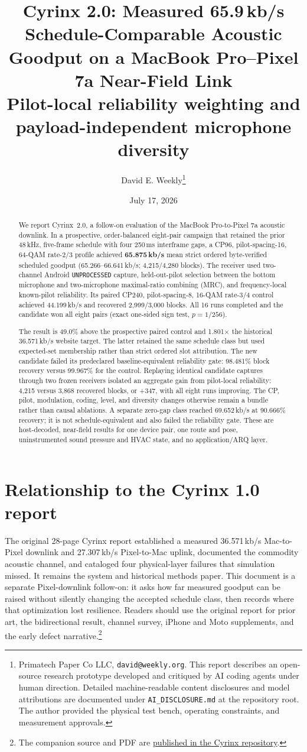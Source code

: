 \documentclass[11pt]{article}
\title{\textbf{Cyrinx 2.0: Measured 65.9\,kb/s Schedule-Comparable
Acoustic Goodput on a MacBook Pro--Pixel 7a Near-Field Link}\\[0.45em]
\large Pilot-local reliability weighting and payload-independent microphone
diversity}
\author{David E. Weekly\thanks{Primatech Paper Co LLC,
\texttt{david@weekly.org}. This report describes an open-source research
prototype developed and critiqued by AI coding agents under human direction. Detailed machine-readable content disclosures and model attributions are documented under \texttt{AI\_DISCLOSURE.md} at the repository root. The author
provided the physical test bench, operating constraints, and measurement
approvals.}}
\date{July 17, 2026}
\newcommand{\cyrtwo}{Cyrinx~2.0}
\begin{document}
\maketitle

\begin{abstract}
We report \cyrtwo, a follow-on evaluation of the MacBook Pro-to-Pixel 7a
acoustic downlink. In a prospective, order-balanced eight-pair campaign that
retained the prior 48\,kHz, five-frame schedule with four 250\,ms interframe
gaps, a
CP96, pilot-spacing-16, 64-QAM rate-2/3 profile achieved
\textbf{65.875\,kb/s} mean strict ordered byte-verified scheduled goodput
(65.266--66.641\,kb/s; 4,215/4,280 blocks). The receiver used two-channel
Android \texttt{UNPROCESSED} capture, held-out-pilot selection between the
bottom microphone and two-microphone maximal-ratio combining (MRC), and
frequency-local known-pilot reliability. Its paired CP240,
pilot-spacing-8, 16-QAM rate-3/4 control achieved 44.199\,kb/s and recovered
2,999/3,000 blocks. All 16 runs completed and the candidate won all eight
pairs (exact one-sided sign test, $p=1/256$).

The result is 49.0\% above the prospective paired control and 1.801$\times$
the historical 36.571\,kb/s website target. The latter retained the same
schedule class but used expected-set membership rather than strict ordered
slot attribution. The new candidate failed its predeclared
baseline-equivalent reliability gate: 98.481\% block recovery versus
99.967\% for the control. Replaying identical candidate captures through two
frozen receivers isolated an aggregate gain from pilot-local reliability:
4,215 versus 3,868 recovered blocks, or +347, with all eight runs improving.
The CP, pilot, modulation, coding, level, and diversity changes otherwise
remain a bundle rather than causal ablations. A separate zero-gap class
reached 69.652\,kb/s at 90.666\% recovery; it is not schedule-equivalent and
also failed the reliability gate. These are host-decoded, near-field results
for one device pair, one route and pose, uninstrumented sound pressure and
HVAC state, and no application/ARQ layer.
\end{abstract}

\section{Relationship to the Cyrinx 1.0 report}
\label{sec:relation}

The original 28-page Cyrinx report established a measured 36.571\,kb/s
Mac-to-Pixel downlink and 27.307\,kb/s Pixel-to-Mac uplink, documented the
commodity acoustic channel, and cataloged four physical-layer failures that
simulation missed. It remains the system and historical methods paper. This
document is a separate Pixel-downlink follow-on: it asks how far measured
goodput can be raised without silently changing the accepted schedule class,
then records where that optimization lost resilience. Readers should use the
original report for prior art, the bidirectional result, channel survey,
iPhone and Moto supplements, and the early defect narrative.\footnote{The
companion source and PDF are
\href{https://github.com/dweekly/cyrinx/tree/main/docs/whitepaper}{published in
the Cyrinx repository}.}
\end{document}
